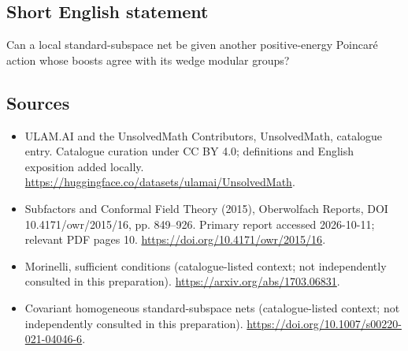 \documentclass[11pt]{article}
\begin{document}
\subsection{Short English statement}
Can a local standard-subspace net be given another positive-energy Poincaré action whose boosts agree with its wedge modular groups?
\subsection{Sources}
\begin{itemize}
\item[\hypertarget{source:statement:1}{S1}] ULAM.AI and the UnsolvedMath Contributors, UnsolvedMath, catalogue entry. Catalogue curation under CC BY 4.0; definitions and English exposition added locally.
\url{https://huggingface.co/datasets/ulamai/UnsolvedMath}.
\item[\hypertarget{source:statement:2}{S2}] Subfactors and Conformal Field Theory (2015), Oberwolfach Reports, DOI 10.4171/owr/2015/16, pp. 849--926. Primary report accessed 2026-10-11; relevant PDF pages 10.
\url{https://doi.org/10.4171/owr/2015/16}.
\item[\hypertarget{source:statement:3}{S3}] Morinelli, sufficient conditions (catalogue-listed context; not independently consulted in this preparation).
\url{https://arxiv.org/abs/1703.06831}.
\item[\hypertarget{source:statement:4}{S4}] Covariant homogeneous standard-subspace nets (catalogue-listed context; not independently consulted in this preparation).
\url{https://doi.org/10.1007/s00220-021-04046-6}.
\end{itemize}
\label{end:statement}
\end{document}
